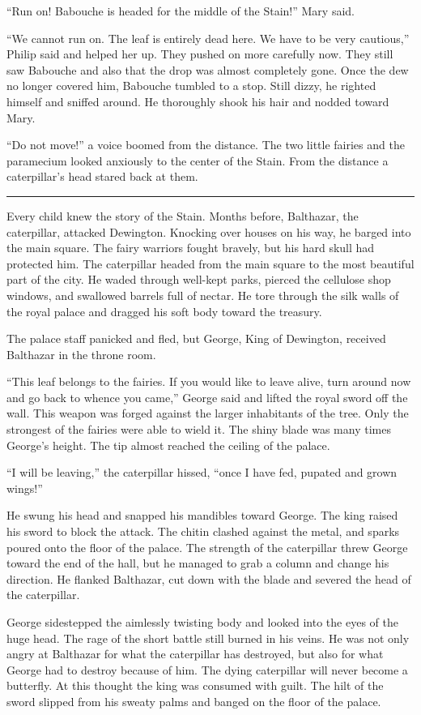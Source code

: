 \documentclass[10pt, draft]{memoir}
\renewcommand{\pfbreakdisplay}{\bigskip \ding{166} \bigskip}
\newcommand{\secbreak}{\fancybreak{\pfbreakdisplay}}
\begin{document}
``Run on! Babouche is headed for the middle of the Stain!'' Mary said.

``We cannot run on. The leaf is entirely dead here. We have to be very
cautious,'' Philip said and helped her up. They pushed on more carefully now.
They still saw Babouche and also that the drop was almost completely gone. Once
the dew no longer covered him, Babouche tumbled to a stop. Still dizzy, he
righted himself and sniffed around. He thoroughly shook his hair and nodded
toward Mary.

``Do not move!'' a voice boomed from the distance. The two little fairies and
the paramecium looked anxiously to the center of the Stain. From the distance a
caterpillar's head stared back at them.

\secbreak

Every child knew the story of the Stain. Months before, Balthazar, the
caterpillar, attacked Dewington. Knocking over houses on his way, he barged
into the main square. The fairy warriors fought bravely, but his hard skull
had protected him. The caterpillar headed from the main square to the most
beautiful part of the city. He waded through well-kept parks, pierced the
cellulose shop windows, and swallowed barrels full of nectar. He tore through
the silk walls of the royal palace and dragged his soft body toward the
treasury.

The palace staff panicked and fled, but George, King of Dewington, received
Balthazar in the throne room.

``This leaf belongs to the fairies. If you would like to leave alive, turn
around now and go back to whence you came,'' George said and lifted the royal
sword off the wall. This weapon was forged against the larger inhabitants of
the tree. Only the strongest of the fairies were able to wield it. The shiny
blade was many times George's height. The tip almost reached the ceiling of the
palace.

``I will be leaving,'' the caterpillar hissed, ``once I have fed, pupated and
grown wings!''

He swung his head and snapped his mandibles toward George. The king raised his
sword to block the attack. The chitin clashed against the metal, and sparks
poured onto the floor of the palace. The strength of the caterpillar threw
George toward the end of the hall, but he managed to grab a column and change
his direction. He flanked Balthazar, cut down with the blade and severed the
head of the caterpillar.

George sidestepped the aimlessly twisting body and looked into the eyes of the
huge head. The rage of the short battle still burned in his veins. He was not
only angry at Balthazar for what the caterpillar has destroyed, but also for
what George had to destroy because of him. The dying caterpillar will never
become a butterfly. At this thought the king was consumed with guilt. The hilt
of the sword slipped from his sweaty palms and banged on the floor of the
palace.
\end{document}
